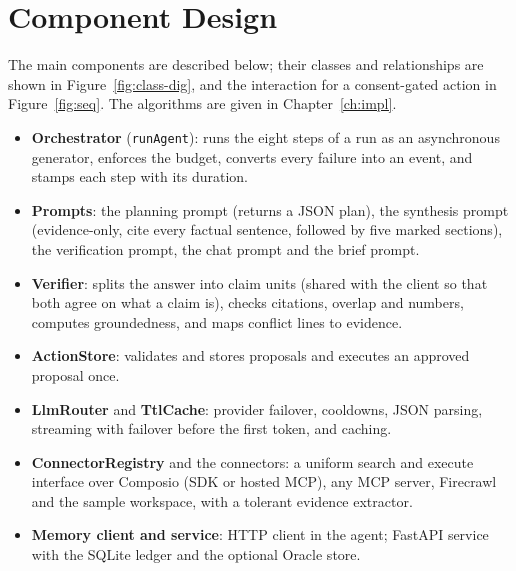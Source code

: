 \documentclass[oneside,a4paper,12pt]{report}
\begin{document}
\section{Component Design}
The main components are described below; their classes and relationships are shown in Figure~\ref{fig:class-dig}, and the interaction for a consent-gated action in Figure~\ref{fig:seq}. The algorithms are given in Chapter~\ref{ch:impl}.
\begin{itemize}
\item \textbf{Orchestrator} (\texttt{runAgent}): runs the eight steps of a run as an asynchronous generator, enforces the budget, converts every failure into an event, and stamps each step with its duration.
\item \textbf{Prompts}: the planning prompt (returns a JSON plan), the synthesis prompt (evidence-only, cite every factual sentence, followed by five marked sections), the verification prompt, the chat prompt and the brief prompt.
\item \textbf{Verifier}: splits the answer into claim units (shared with the client so that both agree on what a claim is), checks citations, overlap and numbers, computes groundedness, and maps conflict lines to evidence.
\item \textbf{ActionStore}: validates and stores proposals and executes an approved proposal once.
\item \textbf{LlmRouter} and \textbf{TtlCache}: provider failover, cooldowns, JSON parsing, streaming with failover before the first token, and caching.
\item \textbf{ConnectorRegistry} and the connectors: a uniform search and execute interface over Composio (SDK or hosted MCP), any MCP server, Firecrawl and the sample workspace, with a tolerant evidence extractor.
\item \textbf{Memory client and service}: HTTP client in the agent; FastAPI service with the SQLite ledger and the optional Oracle store.
\end{itemize}
\end{document}
